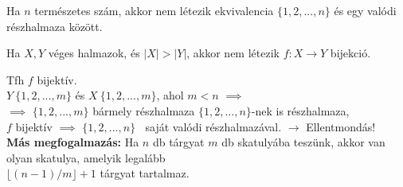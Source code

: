 \begin{frame}[plain]
\end{frame}

\begin{frame}

\begin{tcolorbox}[title={Def.: Halmazok ekvivalenciája}]
\end{tcolorbox}

\begin{tcolorbox}[title={Tétel: Véges halmaz valódi részhalmaza}]
Ha $n$ természetes szám, akkor nem létezik ekvivalencia $\{1, 2, ..., n\}$ és egy valódi részhalmaza között.
\end{tcolorbox}
\end{frame}

\begin{frame}
\begin{tcolorbox}[title={Tétel: Skatulya-elv}]
Ha $X, Y$ véges halmazok, és $|X| > |Y|$, akkor nem létezik $f: X \rightarrow Y$ bijekció.
\end{tcolorbox}

\begin{tcolorbox}[title={Bizonyítás (Indirekt)}]
Tfh $f$ bijektív.\\
$Y ~ \{1, 2, ..., m\}$ és $X ~ \{1, 2, ..., m\}$, ahol $m < n$ $\implies$\\
$\implies$ $\{1, 2, ..., m\}$ bármely részhalmaza $\{1, 2, ..., n\}$-nek is részhalmaza,\\
$f$ bijektív $\implies$ $\{1, 2, ..., n\}$ $~$ saját valódi részhalmazával. $\rightarrow$ Ellentmondás!\\
\bigskip
\textbf{Más megfogalmazás:} Ha $n$ db tárgyat $m$ db skatulyába teszünk, akkor van olyan skatulya, amelyik legalább\\
$\lfloor (n - 1) / m \rfloor + 1$ tárgyat tartalmaz.
\end{tcolorbox}
\end{frame}

